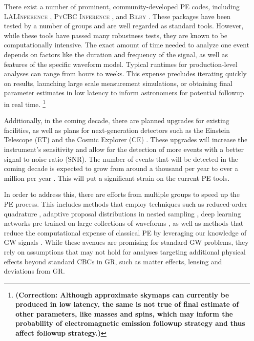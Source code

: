 \documentclass[twocolumn]{aastex631}
\newcommand{\mi}[1]{\textsf{\color{teal}[\textbf{MI:} #1]}}
\newcommand{\corr}[1]{\textbf{\color{pyRed}(Correction: #1)}}
\begin{document}
There exist a number of prominent, community-developed PE codes, including
\textsc{LALInference} \citep{Veitch:2014wba}, \textsc{PyCBC Inference}
\citep{Biwer:2018osg}, and \textsc{Bilby}
\citep{Ashton:2018jfp,Romero-Shaw:2020owr}.  These packages have been tested by a
number of groups and are well regarded as standard tools. However, while these
tools have passed many robustness tests, they are known to be computationally
intensive. The exact amount of time needed to analyze one event depends on
factors like the duration and frequency of the signal, as well as features of
the specific waveform model. Typical runtimes for production-level analyses can
range from hours to weeks.
This expense precludes iterating quickly on results,
launching large scale measurement simulations, or obtaining final parameter estimates in low
latency to inform astronomers for potential followup in real time.%
\footnote{\corr{Although approximate skymaps can currently be produced in low latency, the same is not true 
of final estimate of other parameters, like masses and spins, which may inform the probability of electromagnetic emission
 followup strategy and thus affect followup strategy.}}

Additionally, in the coming decade, there are planned upgrades for existing
facilities, as well as plans for next-generation detectors such as the Einstein
Telescope (ET) \citep{Punturo:2010zz} and the Cosmic Explorer (CE)
\citep{LIGOScientific:2016wof}. These upgrades will increase the instrument's sensitivity
and allow for the detection of more events with a better
signal-to-noise ratio (SNR). The number of events that will be detected in the
coming decade is expected to grow from around a thousand per year to over a
million per year \citep{Baibhav:2019gxm}. This will put a significant strain on
the current PE tools.

In order to address this, there are efforts from multiple groups to speed up the
PE process. This includes methods that employ techniques such as
reduced-order quadrature \citep{Canizares:2014fya,Smith:2016qas}, adaptive proposal distributions in nested sampling
\citep{Williams:2021qyt}, deep learning networks pre-trained on large collections
of waveforms \citep{Dax:2021tsq,Dax:2022pxd}, as well as methods that reduce the
computational expense of classical PE by leveraging our knowledge of GW signals
\citep{Veitch:2014wba,Ashton:2021anp,Cornish:2021wxy,Islam:2022afg,Roulet:2022kot,Lee:2022jpn,Lange:2018pyp,Wofford:2022ykb}.
While these avenues are promising for standard GW problems, they rely on
assumptions that may not hold for analyses targeting additional physical effects
beyond standard CBCs in GR, such as matter effects, lensing and deviations from GR.
\end{document}
